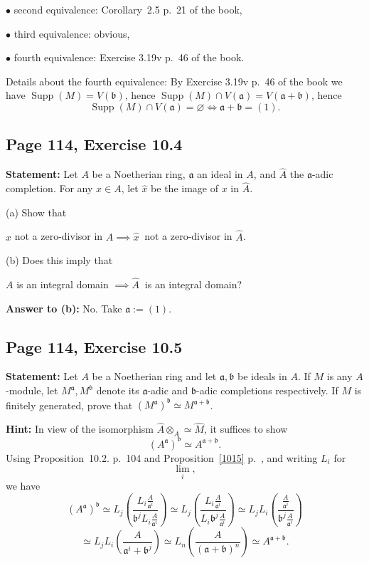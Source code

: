 \documentclass[parskip=half,fontsize=12pt]{scrartcl}%
\newcommand{\oo}{\operatorname}\newcommand{\ooo}{\operatorname*}
\newcommand{\mf}{\mathfrak}
\newcommand{\aaa}{\mf a}
\newcommand{\bbb}{\mf b}
\newcommand{\bu}{\bullet}
\begin{document}
$\bu$ second equivalence: Corollary~2.5 p.~21 of the book,

$\bu$ third equivalence: obvious,

$\bu$ fourth equivalence: Exercise 3.19v p.~46 of the book. 

Details about the fourth equivalence: By Exercise 3.19v p.~46 of the book we have $\oo{Supp}(M)=V(\bbb)$, hence $\oo{Supp}(M)\cap V(\aaa)=V(\aaa+\bbb)$, hence 
$$
\oo{Supp}(M)\cap V(\aaa)=\varnothing\iff\aaa+\bbb=(1).
$$ 

\subsection{Page 114, Exercise 10.4}%

\textbf{Statement:} Let $A$ be a Noetherian ring, $\aaa$ an ideal in $A$, and $\widehat A$ the $\aaa$-adic completion. For any $x\in A$, let $\widehat x$ be the image of $x$ in $\widehat A$. 

(a) Show that\smallskip 

\centerline{$x$ not a zero-divisor in $A\implies\widehat x\ $ not a zero-divisor in $\widehat A$.} 

(b) Does this imply that\smallskip 

\centerline{$A$ is an integral domain $\implies\widehat A\ $ is an integral domain?}

\textbf{Answer to (b):} No. Take $\aaa:=(1)$. 

\subsection{Page 114, Exercise 10.5}%

\textbf{Statement:} Let $A$ be a Noetherian ring and let $\aaa,\bbb$ be ideals in $A$. If $M$ is any $A$-module, let $M^\aaa,M^\bbb$ denote its $\aaa$-adic and $\bbb$-adic completions respectively. If $M$ is finitely generated, prove that $(M^\aaa)^\bbb\simeq M^{\aaa+\bbb}$.

\textbf{Hint:} In view of the isomorphism $\widehat A\otimes_A\simeq\widehat M$, it suffices to show 
\begin{equation}\label{aba+b}
(A^\aaa)^\bbb\simeq A^{\aaa+\bbb}. 
\end{equation} 
Using Proposition~10.2. p.~104 and Proposition~\ref{1015} p.~\pageref{1015}, and writing $L_i$ for 
$$
\lim_i,
$$ 
we have 
$$
(A^\aaa)^\bbb\simeq 
L_j\left(\frac{L_i\frac{A}{\aaa^i}}{\bbb^jL_i\frac{A}{\aaa^i}}\right)\simeq 
L_j\left(\frac{L_i\frac{A}{\aaa^i}}{L_i\bbb^j\frac{A}{\aaa^i}}\right)\simeq 
L_jL_i\left(\frac{\frac{A}{\aaa^i}}{\bbb^j\frac{A}{\aaa^i}}\right)
$$ 
$$
\simeq L_jL_i\left(\frac{A}{\aaa^i+\bbb^j}\right)
\simeq L_n\left(\frac{A}{(\aaa+\bbb)^n}\right)
\simeq A^{\aaa+\bbb}.
$$ 
\end{document}
